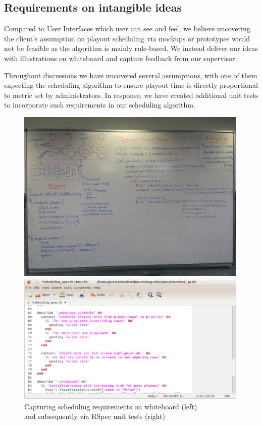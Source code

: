\documentclass[a4paper]{article}
\begin{document}
\subsection{Requirements on intangible ideas}
Compared to User Interfaces which user can see and feel, we believe 
uncovering the client's assumption on playout scheduling via mockups or 
prototypes would not be feasible as the algorithm is mainly rule-based.
We instead deliver our ideas with illustrations on whiteboard and
capture feedback from our supervisor.

Throughout discussions we have uncovered several assumptions, with one of them
expecting the scheduling algorithm to ensure playout time is 
directly proportional to metric set by administrators. In response,
we have created additional unit tests to incorporate such requirements 
in our scheduling algorithm.

\begin{figure}[H]
  \begin{minipage}{0.46\textwidth}
      \includegraphics[width = 0.99\textwidth, trim = 0 1cm 0 1.5cm, clip]{./evaluation/scheduling_whiteboard.jpg}
  \end{minipage}
  \begin{minipage}{0.53\textwidth}
      \includegraphics[width = 0.99\textwidth]{./evaluation/scheduling_spec.png}
  \end{minipage}
  \caption{Capturing scheduling requirements on whiteboard (left)\\ and subsequently via RSpec unit tests (right)}
 
\end{figure}
\end{document}
